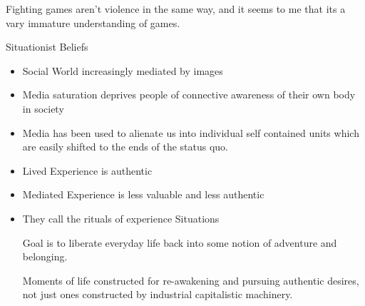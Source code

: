 \documentclass{report}
\begin{document}
\begin{description}
\begin{mdframed}
\begin{itemize}
\begin{mdframed}
                        Fighting games aren't violence in the same
                        way, and it seems to me that its a vary
                        immature understanding of games.
                    \end{mdframed}
            \end{itemize}
            {\large Situationist Beliefs}
            \begin{itemize}
                \item Social World increasingly mediated by
                    images
                \item Media saturation deprives people of
                    connective awareness of their own body
                    in society
                \item Media has been used to alienate us into
                    individual self contained units which
                    are easily shifted to the ends of
                    the status quo.
                \item Lived Experience is authentic
                \item Mediated Experience is less valuable
                    and less authentic
                \item They call the rituals of experience
                    Situations
                    \begin{mdframed}
                        Goal is to liberate everyday life
                        back into some notion of adventure
                        and belonging.

                        \vspace{10pt}

                        Moments of life constructed for
                        re-awakening and pursuing authentic
                        desires, not just ones constructed by
                        industrial capitalistic machinery.
                    \end{mdframed}
            \end{itemize}
        \end{mdframed}
\end{description}
\end{document}

